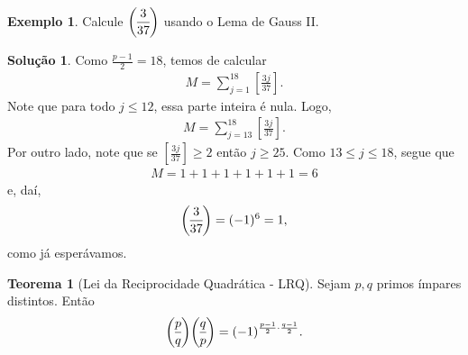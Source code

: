 \documentclass[a4paper,11pt,twoside, leqno]{article}
\newcommand{\genlegendre}[4]{%
	\genfrac{(}{)}{}{#1}{#3}{#4}%
	\if\relax\detokenize{#2}\relax\else_{\!#2}\fi
}
\newcommand{\legendre}[3][]{\genlegendre{}{#1}{#2}{#3}}
\theoremstyle{definition}
\newtheorem{theorem}{Teorema}[section]
\newtheorem*{example}{Exemplo}
\newtheorem*{solution}{Solução}
\begin{document}
\begin{example}
	Calcule $\displaystyle{ \legendre[]{3}{37} }$ usando o Lema de Gauss II.
\end{example}
\begin{solution}
	Como $\displaystyle{ \frac{p-1}{2} = 18 }$, temos de calcular
	\begin{align*}
	M = \sum_{j=1}^{18}\left[ \frac{3j}{37} \right].
	\end{align*}
	Note que para todo $j\leq 12$, essa parte inteira é nula. Logo,
	\begin{align*}
	M = \sum_{j=13}^{18}\left[ \frac{3j}{37} \right].
	\end{align*}
	Por outro lado, note que se $\displaystyle{ \left[ \frac{3j}{37} \right]\geq 2 }$ então $j\geq 25$. Como $13\leq j\leq 18$, segue que
	\begin{align*}
	M = 1+1+1+1+1+1 = 6
	\end{align*}
	e, daí,
	\begin{align*}
	\legendre[]{3}{37} = (-1)^6 = 1,
	\end{align*}
	como já esperávamos.
\end{solution}
\begin{theorem}[Lei da Reciprocidade Quadrática - LRQ]
	Sejam $p,q$ primos ímpares distintos. Então
	\begin{align*}
	\legendre[]{p}{q}\legendre[]{q}{p} = (-1)^{\frac{p-1}{2}\cdot\frac{q-1}{2}}.
	\end{align*}
\end{theorem}
\end{document}
